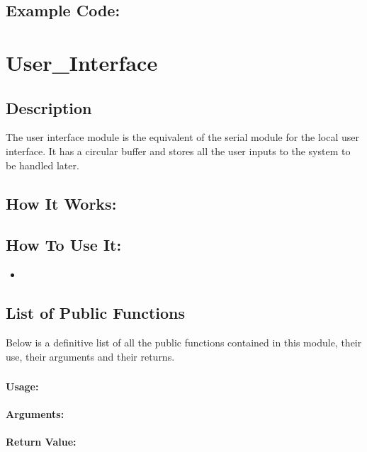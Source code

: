 \documentclass[]{report}
\begin{document}
\section{Example Code:}


\chapter{User\_Interface}
\section{Description}
The user interface module is the equivalent of the serial module for the local user interface. It has a circular buffer and stores all the user inputs to the system to be handled later.

\section{How It Works:}

\section{How To Use It:}
\begin{itemize}
	\item 
\end{itemize}

\section{List of Public Functions}
Below is a definitive list of all the public functions contained in this module, their use, their arguments and their returns.

\subsection{}
\subsubsection{Usage:}

\subsubsection{Arguments:}

\subsubsection{Return Value:}
\end{document}

